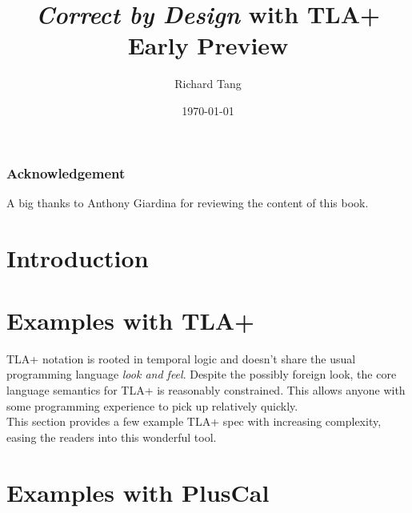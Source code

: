 \documentclass{kdp}
\title{\textit{Correct by Design} with TLA+ \\ Early Preview}
\author{Richard Tang}
\date{\today}
\begin{document}
\maketitle


\section*{Acknowledgement}

A big thanks to Anthony Giardina for reviewing the content of this book.

\tableofcontents

\part{Introduction}





\part{Examples with TLA+}

TLA+ notation is rooted in temporal logic and doesn't share the usual
programming language \textit{look and feel}. Despite the possibly foreign look,
the core language semantics for TLA+ is reasonably constrained. This allows
anyone with some programming experience to pick up relatively quickly. \\

This section provides a few example TLA+ spec with increasing complexity, easing
the readers into this wonderful tool.

% 

















\part{Examples with PlusCal}
\end{document}
